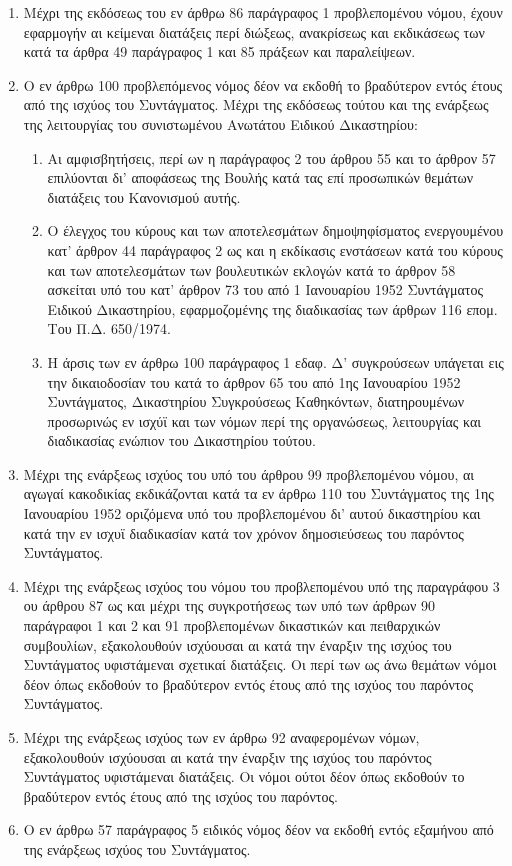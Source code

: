 \documentclass[twoside, a4paper, 10pt]{article}
\begin{document}
\begin{multicols}{2}
\begin{enumerate}
\begin{BigQuote}
\begin{enumerate}
  \item[1.] Μέχρι της εκδόσεως του εν άρθρω 86 παράγραφος 1 προβλεπομένου νόμου, έχουν εφαρμογήν αι κείμεναι διατάξεις περί διώξεως, ανακρίσεως και εκδικάσεως των κατά τα άρθρα 49 παράγραφος 1 και 85 πράξεων και παραλείψεων.
  \item[2.] Ο εν άρθρω 100 προβλεπόμενος νόμος δέον να εκδοθή το βραδύτερον εντός έτους από της ισχύος του Συντάγματος. Μέχρι της εκδόσεως  τούτου και της ενάρξεως της λειτουργίας του συνιστωμένου Ανωτάτου Ειδικού Δικαστηρίου:
	\begin{enumerate}
	  \item[α)] Αι αμφισβητήσεις, περί ων η παράγραφος 2 του άρθρου 55 και το άρθρον 57 επιλύονται  δι' αποφάσεως της Βουλής κατά τας επί προσωπικών θεμάτων διατάξεις του Κανονισμού αυτής.
	  \item[β)] Ο έλεγχος του κύρους και των αποτελεσμάτων δημοψηφίσματος ενεργουμένου κατ' άρθρον 44 παράγραφος 2 ως και η εκδίκασις ενστάσεων κατά του κύρους και των αποτελεσμάτων των βουλευτικών εκλογών κατά το άρθρον 58 ασκείται υπό του κατ' άρθρον 73 του από 1 Ιανουαρίου 1952 Συντάγματος Ειδικού Δικαστηρίου, εφαρμοζομένης της διαδικασίας των άρθρων 116 επομ. Του Π.Δ. 650/1974. 
	  \item[γ)] Η άρσις των εν άρθρω 100 παράγραφος 1 εδαφ. Δ' συγκρούσεων υπάγεται εις την δικαιοδοσίαν  του κατά το άρθρον 65 του από 1ης Ιανουαρίου 1952 Συντάγματος, Δικαστηρίου Συγκρούσεως  Καθηκόντων, διατηρουμένων προσωρινώς εν ισχύϊ  και των νόμων περί της οργανώσεως, λειτουργίας και διαδικασίας ενώπιον του Δικαστηρίου τούτου.
	\end{enumerate}
  \item[3.] Μέχρι της ενάρξεως ισχύος του υπό του άρθρου 99 προβλεπομένου νόμου, αι αγωγαί κακοδικίας εκδικάζονται κατά τα εν άρθρω 110 του Συντάγματος της 1ης Ιανουαρίου 1952 οριζόμενα υπό του προβλεπομένου δι' αυτού δικαστηρίου και κατά την εν ισχυϊ διαδικασίαν κατά τον χρόνον δημοσιεύσεως του παρόντος Συντάγματος.
  \item[4.] Μέχρι της ενάρξεως ισχύος του νόμου του προβλεπομένου υπό της παραγράφου 3 ου άρθρου 87 ως και μέχρι της συγκροτήσεως των υπό των άρθρων 90 παράγραφοι 1 και 2 και 91 προβλεπομένων δικαστικών και πειθαρχικών συμβουλίων, εξακολουθούν ισχύουσαι αι κατά την έναρξιν της ισχύος του Συντάγματος υφιστάμεναι σχετικαί διατάξεις. Οι περί των ως άνω θεμάτων νόμοι δέον όπως εκδοθούν το βραδύτερον εντός έτους από της ισχύος του παρόντος Συντάγματος.
  \item[5.] Μέχρι της ενάρξεως ισχύος των εν άρθρω 92 αναφερομένων νόμων, εξακολουθούν ισχύουσαι αι κατά την έναρξιν της ισχύος του παρόντος Συντάγματος υφιστάμεναι διατάξεις. Οι νόμοι ούτοι δέον όπως εκδοθούν το βραδύτερον εντός έτους από της ισχύος του παρόντος.
  \item[6.] Ο εν άρθρω 57 παράγραφος 5 ειδικός νόμος δέον να εκδοθή εντός εξαμήνου από της ενάρξεως ισχύος του Συντάγματος.
\end{enumerate}


\end{BigQuote}
\end{enumerate}
\end{multicols}
\end{document}
